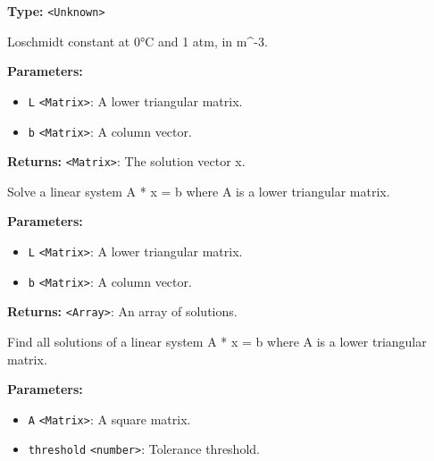 \documentclass[12pt,a4paper]{article}
\begin{document}
\noindent \textbf{Type:} \texttt{<Unknown>}

\noindent Loschmidt constant at 0°C and 1 atm, in m\textasciicircum{}-3.

\vspace{5mm}
\noindent {}


\noindent \textbf{Parameters:}
\begin{itemize}
  \item \texttt{L} \texttt{<Matrix>}: A lower triangular matrix.
  \item \texttt{b} \texttt{<Matrix>}: A column vector.
\end{itemize}

\noindent \textbf{Returns:} \texttt{<Matrix>}: The solution vector x.

\noindent Solve a linear system A * x = b where A is a lower triangular matrix.

\vspace{5mm}
\noindent {}


\noindent \textbf{Parameters:}
\begin{itemize}
  \item \texttt{L} \texttt{<Matrix>}: A lower triangular matrix.
  \item \texttt{b} \texttt{<Matrix>}: A column vector.
\end{itemize}

\noindent \textbf{Returns:} \texttt{<Array>}: An array of solutions.

\noindent Find all solutions of a linear system A * x = b where A is a lower triangular matrix.

\vspace{5mm}
\noindent {}


\noindent \textbf{Parameters:}
\begin{itemize}
  \item \texttt{A} \texttt{<Matrix>}: A square matrix.
  \item \texttt{threshold} \texttt{<number>}: Tolerance threshold.
\end{itemize}
\end{document}
